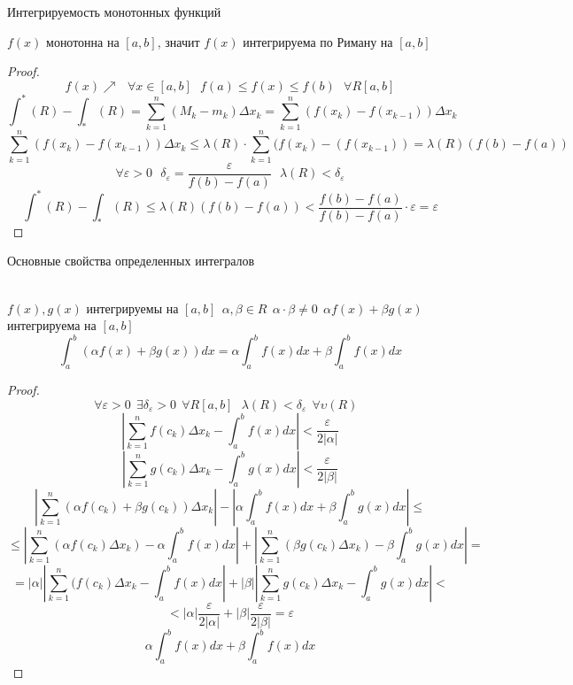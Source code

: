 \begin{title}[\Large]
  Интегрируемость монотонных функций
\end{title}

\begin{theorem}
  $f(x)$ монотонна на $[a,b]$, значит $f(x)$ интегрируема по Риману на $[a,b]$
\end{theorem}

\begin{proof}
  \[
  f(x)\nearrow ~~~ \forall x \in [a,b] ~~~ f(a) \le f(x) \le f(b) ~~~
  \forall R[a,b]
  \]
  \[
    \int^* (R) - \int_* (R) = \sum_{k = 1}^{n} (M_k - m_k) \Delta x_k
    = \sum_{k = 1}^{n} (f(x_k) - f(x_{k-1})) \Delta x_k
  \]
  \[
    \sum_{k = 1}^{n} (f(x_k) - f(x_{k-1})) \Delta x_k \le \lambda(R) \cdot
    \sum_{k = 1}^{n} (f(x_k) - (f(x_{k - 1})) = \lambda (R) (f(b) - f(a))
  \]
  \[
    \forall \varepsilon > 0 ~~~ \delta_\varepsilon = \frac{\varepsilon}{f(b) -
    f(a)} ~~~ \lambda (R) < \delta_\varepsilon
  \]
  \[
  \int^* (R) - \int_* (R) \le \lambda (R) (f(b) - f(a)) <
  \frac{f(b)-f(a)}{f(b)-f(a)} \cdot \varepsilon = \varepsilon
  \]
\end{proof}

\begin{title}[\Large]
  Основные свойства определенных интегралов
\end{title}

\\
$f(x), g(x)$ интегрируемы на $[a,b] ~~ \alpha , \beta \in R ~~
\alpha \cdot \beta \not= 0 ~~ \alpha f(x) + \beta g(x)$ интегрируема на $[a,b]$
\[
    \int_a^b (\alpha f(x) + \beta g(x))dx = \alpha \int_a^b f(x)dx
    + \beta \int_a^b f(x)dx
\]

\begin{proof}
    \[
        \forall\varepsilon>0 ~~ \exists\delta_{\varepsilon}>0 ~~ \forall R[a,b]
        ~~~ \lambda(R) < \delta_{\varepsilon} ~~ \forall\upsilon(R) ~~~
    \]
    \[
        \left| \sum_{k=1}^{n} f(c_k)\Delta x_k -
        \int_a^b f(x)dx \right| < \frac{\varepsilon}{2|\alpha|}
    \]
    \[
        \left| \sum_{k=1}^{n} g(c_k)\Delta x_k -
        \int_a^b g(x)dx \right| < \frac{\varepsilon}{2|\beta|}
    \]
    \[
        \left| \sum_{k=1}^{n} (\alpha f(c_k) + \beta g(c_k))\Delta x_k \right| -
        \left| \alpha \int_a^b f(x)dx + \beta \int_a^b g(x)dx \right| \le
    \]
    \[
      \le \left| \sum_{k=1}^{n} (\alpha f(c_k) \Delta x_k) -
      \alpha \int_a^b f(x)dx \right| + \left| \sum_{k=1}^{n} (\beta g(c_k)
      \Delta x_k) - \beta \int_a^b g(x)dx \right| =
    \]
    \[
      = |\alpha| \left| \sum_{k=1}^{n} (f(c_k) \Delta x_k -
      \int_a^b f(x)dx \right| + |\beta| \left| \sum_{k=1}^{n} g(c_k)
      \Delta x_k - \int_a^b g(x)dx \right| <
    \]
    \[
        < |\alpha| \frac{\varepsilon}{2|\alpha|} + |\beta|
        \frac{\varepsilon}{2|\beta|} = \varepsilon
    \]
    \[\alpha \int_a^b f(x)dx + \beta \int_a^b f(x)dx\]
\end{proof}

